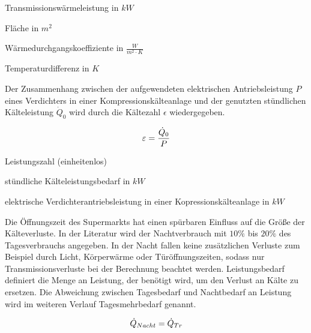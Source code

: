 \begin{description}[\dth]

	\item[$\ptrans$] Transmissionswärmeleistung in $kW$
	\item[$A$] Fläche in $m^2$
	\item[$k$] Wärmedurchgangskoeffiziente in $\frac{W}{m^2 \cdot K}$
	\item[$\Delta\: t$] Temperaturdifferenz in $K$

\end{description}
\vspace{0.5cm}

Der Zusammenhang zwischen der aufgewendeten elektrischen Antriebsleistung $P$
eines Verdichters in einer Kompressionskälteanlage und der genutzten
st\"undlichen Kälteleistung ${\dot{Q}}_0$ wird durch die Kältezahl $\epsilon$
wiedergegeben.

\begin{equation}
	\epsilon = \frac{\pkalt}{P}
\label{epsilon}
\end{equation}

\begin{description}[\dth]

	\item[$\epsilon$] Leistungszahl (einheitenlos)
	\item[$\pkalt$] st\"undliche Kälteleistungsbedarf in $kW$
	\item[$P$] elektrische Verdichterantriebsleistung in einer
		Kopressionskälteanlage in $kW$

\end{description}
\vspace{0.5cm}

Die Öffnungszeit des Supermarkts hat einen spürbaren Einfluss auf die Größe der
K\"alteverluste. In der Literatur wird der Nachtverbrauch mit $10\%$ bis $20\%$
des Tagesverbrauchs angegeben\cite{kauffeld}.  In der Nacht fallen keine
zusätzlichen Verluste zum Beispiel durch Licht, Körperwärme oder
Türöffnungszeiten, sodass nur Transmissionsverluste bei der Berechnung beachtet
werden. Leistungsbedarf definiert die Menge an Leistung, der ben\"otigt wird, um
den Verlust an K\"alte zu ersetzen. Die Abweichung zwischen Tagesbedarf und
Nachtbedarf an Leistung wird im weiteren Verlauf Tagesmehrbedarf genannt.

\begin{equation}
	\dot{Q}_{Nacht}=\ptrans
\label{pnacht}
\end{equation}

